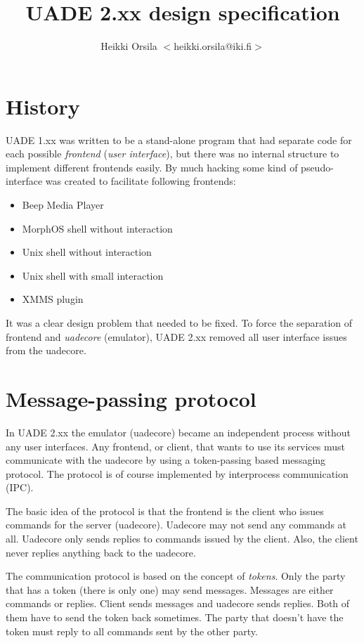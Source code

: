 \documentclass{article}
\begin{document}
\title{UADE 2.xx design specification}
\author{Heikki Orsila $<$heikki.orsila@iki.fi$>$}
\date{}
\maketitle

\section{History}

UADE 1.xx was written to be a stand-alone program that had separate code
for each possible \emph{frontend} (\emph{user interface}), but there was
no internal structure to implement different frontends easily. By much
hacking some kind of pseudo-interface was created to facilitate following
frontends:
\begin{itemize}
  \item Beep Media Player
  \item MorphOS shell without interaction
  \item Unix shell without interaction
  \item Unix shell with small interaction
  \item XMMS plugin
\end{itemize}

It was a clear design problem that needed to be fixed. To force the separation
of frontend and \emph{uadecore} (emulator), UADE 2.xx removed all user
interface issues from the uadecore.

\section{Message-passing protocol}
In UADE 2.xx the emulator (uadecore) became an independent process without
any user interfaces. Any frontend, or client, that wants to use its services
must communicate with the uadecore by using a token-passing based messaging
protocol. The protocol is of course implemented by interprocess communication
(IPC).

The basic idea of the protocol is that the frontend is the client
who issues commands for the server (uadecore). Uadecore may not send any
commands at all. Uadecore only sends replies to commands issued by the
client. Also, the client never replies anything back to the
uadecore.

The communication protocol is based on the concept of
\emph{tokens}. Only the party that has a token (there is only one) may
send messages. Messages are either commands or replies. Client sends
messages and uadecore sends replies. Both of them have to send the token back
sometimes. The party that doesn't have the token must reply to all commands
sent by the other party.
\end{document}

